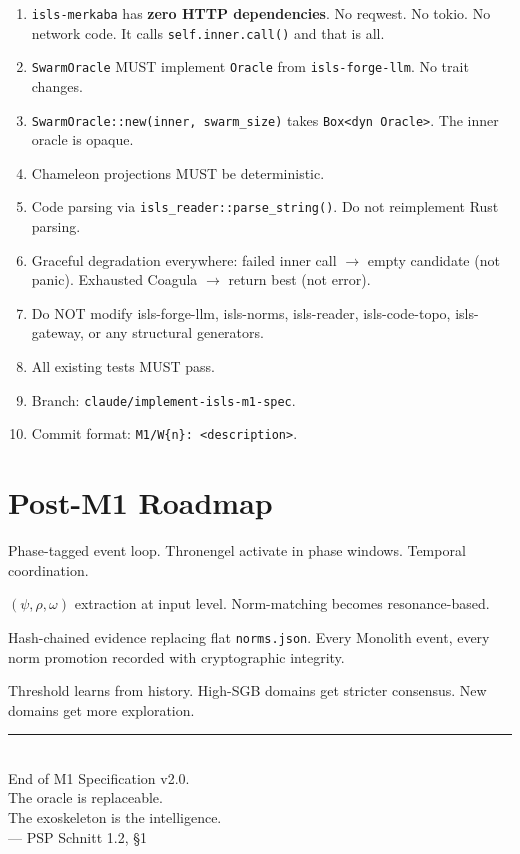\documentclass[11pt,a4paper]{article}
\begin{document}
\begin{enumerate}
\item \texttt{isls-merkaba} has \textbf{zero HTTP dependencies}. 
      No reqwest. No tokio. No network code. It calls 
      \texttt{self.inner.call()} and that is all.
\item \texttt{SwarmOracle} MUST implement \texttt{Oracle} from 
      \texttt{isls-forge-llm}. No trait changes.
\item \texttt{SwarmOracle::new(inner, swarm\_size)} takes 
      \texttt{Box<dyn Oracle>}. The inner oracle is opaque.
\item Chameleon projections MUST be deterministic.
\item Code parsing via \texttt{isls\_reader::parse\_string()}.
      Do not reimplement Rust parsing.
\item Graceful degradation everywhere: failed inner call $\to$ 
      empty candidate (not panic). Exhausted Coagula $\to$ return 
      best (not error).
\item Do NOT modify isls-forge-llm, isls-norms, isls-reader, 
      isls-code-topo, isls-gateway, or any structural generators.
\item All existing tests MUST pass.
\item Branch: \texttt{claude/implement-isls-m1-spec}.
\item Commit format: \texttt{M1/W\{n\}: <description>}.
\end{enumerate}


\section{Post-M1 Roadmap}

\begin{description}[nosep]
\item[M2 --- ScorpioSync:] Phase-tagged event loop. Thronengel 
  activate in phase windows. Temporal coordination.
\item[M3 --- Gabriel Cells:] $(\psi, \rho, \omega)$ extraction 
  at input level. Norm-matching becomes resonance-based.
\item[M4 --- MEF Ledger:] Hash-chained evidence replacing flat 
  \texttt{norms.json}. Every Monolith event, every norm 
  promotion recorded with cryptographic integrity.
\item[M5 --- Adaptive $\Theta$:] Threshold learns from history. 
  High-SGB domains get stricter consensus. New domains get 
  more exploration.
\end{description}

\vfill
\begin{center}
\color{isls-gray}\rule{0.5\textwidth}{0.4pt}\\[0.5em]
{\small End of M1 Specification v2.0.\\[0.3em]
The oracle is replaceable.\\
The exoskeleton is the intelligence.\\
--- PSP Schnitt 1.2, \S1}
\end{center}
\end{document}
